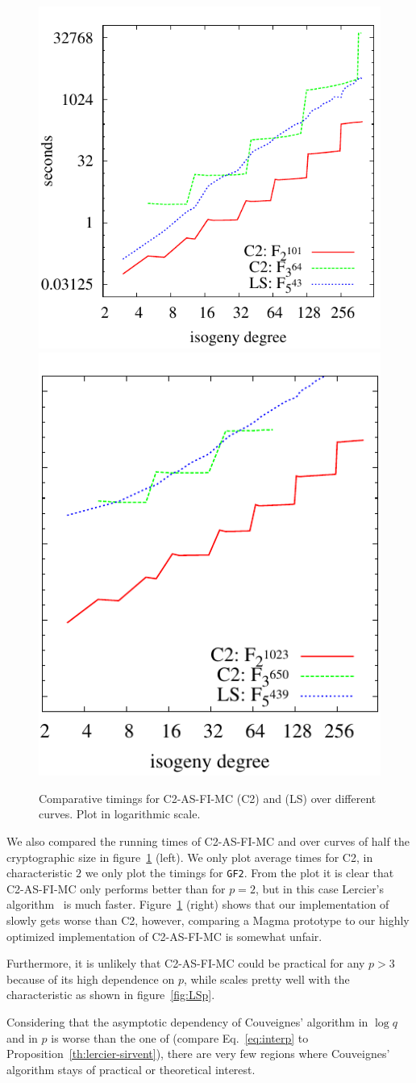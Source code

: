\begin{figure}
  \centering
  \includegraphics[height=0.45\textwidth]{isogeny/C2-LS}
  \includegraphics[height=0.45\textwidth]{isogeny/C2-LS2}
  \caption{Comparative timings for C2-AS-FI-MC (C2) and
     (LS) over different curves. Plot in
    logarithmic scale.}
  \label{fig:comp}
\end{figure}

We also compared the running times of C2-AS-FI-MC and
 over curves of half the cryptographic size in
figure~\ref{fig:comp} (left). We only plot average times for C2, in
characteristic $2$ we only plot the timings for \texttt{GF2}. From the
plot it is clear that C2-AS-FI-MC only performs better than
 for $p=2$, but in this case Lercier's
algorithm~\cite{lercier96} is much faster.  Figure~\ref{fig:comp}
(right) shows that our implementation of  slowly
gets worse than C2, however, comparing a Magma prototype to our highly
optimized implementation of C2-AS-FI-MC is somewhat unfair.

Furthermore, it is unlikely that C2-AS-FI-MC could be practical for
any $p>3$ because of its high dependence on $p$, while
 scales pretty well with the characteristic as
shown in figure~\ref{fig:LSp}.

Considering that the asymptotic dependency of Couveignes' algorithm in
$\log q$ and in $p$ is worse than the one of 
(compare Eq.~\eqref{eq:interp} to
Proposition~\ref{th:lercier-sirvent}), there are very few regions
where Couveignes' algorithm stays of practical or theoretical
interest.

